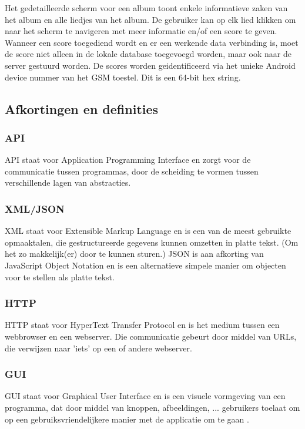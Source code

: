 \documentclass[11pt,a4paper]{article}
\begin{document}
Het gedetailleerde scherm voor een album toont enkele informatieve zaken van het album en alle liedjes van het album. De gebruiker kan op elk lied klikken om naar het scherm te navigeren met meer informatie en/of een score te geven. 
\\ 
	
Wanneer een score toegediend wordt en er een werkende data verbinding is, moet de score niet alleen in de lokale database toegevoegd worden, maar ook naar de server gestuurd worden. De scores worden geidentificeerd via het unieke Android device nummer van het GSM toestel. Dit is een 64-bit hex string. 
	
	
	\subsection{Afkortingen en definities}
		\subsubsection{API}
		API staat voor Application Programming Interface en zorgt voor de communicatie tussen programmas, door de scheiding te vormen tussen verschillende lagen van abstracties.
		\subsubsection{XML/JSON}
		XML staat voor Extensible Markup Language en is een van de meest gebruikte opmaaktalen, die gestructureerde gegevens kunnen omzetten in platte tekst. (Om het zo makkelijk(er) door te kunnen sturen.)
		\newline
		JSON is aan afkorting van JavaScript Object Notation en is een alternatieve simpele manier om objecten voor te stellen als platte tekst.
		\subsubsection{HTTP}
		HTTP staat voor HyperText Transfer Protocol en is het medium tussen een webbrowser en een webserver. Die communicatie gebeurt door middel van URLs, die verwijzen naar 'iets' op een of andere webserver.
		\subsubsection{GUI}
		GUI staat voor Graphical User Interface en is een visuele vormgeving van een programma, dat door middel van knoppen, afbeeldingen, ... gebruikers toelaat om op een gebruiksvriendelijkere manier met de applicatie om te gaan .
\end{document}
